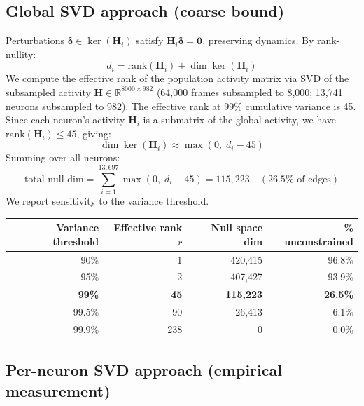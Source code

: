 \documentclass[11pt,a4paper]{article}
\begin{document}
\subsection{Global SVD approach (coarse bound)}\label{subsec:global-svd}

Perturbations $\boldsymbol{\delta} \in \ker(\mathbf{H}_i)$ satisfy $\mathbf{H}_i \boldsymbol{\delta} = \mathbf{0}$, preserving dynamics. By rank-nullity:
\begin{equation}
d_i = \text{rank}(\mathbf{H}_i) + \dim\ker(\mathbf{H}_i)
\end{equation}
We compute the effective rank of the population activity matrix via SVD of the subsampled activity $\mathbf{H} \in \mathbb{R}^{8000 \times 982}$ (64,000 frames subsampled to 8,000; 13,741 neurons subsampled to 982). The effective rank at 99\% cumulative variance is 45. Since each neuron's activity $\mathbf{H}_i$ is a submatrix of the global activity, we have $\text{rank}(\mathbf{H}_i) \leq 45$, giving:
\begin{equation}
\dim\ker(\mathbf{H}_i) \approx \max(0, \; d_i - 45)
\end{equation}
Summing over all neurons:
\begin{equation}\label{eq:null}
\text{total null dim} = \sum_{i=1}^{13,697} \max(0, \; d_i - 45) = 115,223 \quad (26.5\% \text{ of edges})
\end{equation}
We report sensitivity to the variance threshold.

\begin{center}
\begin{tabular}{rrrr}
\toprule
Variance threshold & Effective rank $r$ & Null space dim & \% unconstrained \\
\midrule
90\%  & 1 & 420,415 & 96.8\% \\
95\%  & 2 & 407,427 & 93.9\% \\
\textbf{99\%}  & \textbf{45}  & \textbf{115,223} & \textbf{26.5\%} \\
99.5\% & 90 & 26,413 & 6.1\% \\
99.9\% & 238 & 0 & 0.0\% \\
\bottomrule
\end{tabular}
\end{center}

\subsection{Per-neuron SVD approach (empirical measurement)}
\end{document}
